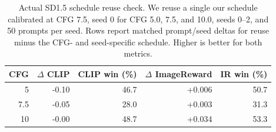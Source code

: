 \begin{table}[t]
  \centering
  \caption{Actual SD1.5 schedule reuse check. We reuse a single
  our schedule calibrated at CFG 7.5, seed 0 for CFG 5.0, 7.5,
  and 10.0, seeds 0--2, and 50 prompts per seed. Rows report matched prompt/seed
  deltas for reuse minus the CFG- and seed-specific schedule.
  Higher is better for both metrics.}
  \label{tab:sd15-euler-nfe10-reuse-cfg7p5-seed0}
  \begin{tabular}{rrrrr}
    \toprule
    CFG & $\Delta$ CLIP & CLIP win (\%) & $\Delta$ ImageReward & IR win (\%) \\
    \midrule
    5 & -0.10 & 46.7 & +0.006 & 50.7 \\
    7.5 & -0.05 & 28.0 & +0.003 & 31.3 \\
    10 & -0.00 & 48.7 & +0.034 & 53.3 \\
    \bottomrule
  \end{tabular}
\end{table}
